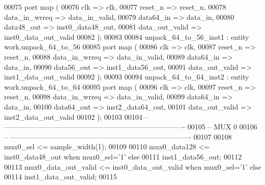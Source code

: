 \begin{DoxyCode}
00075 \textcolor{keywordflow}{port} \textcolor{keywordflow}{map} (
00076        clk              => clk,
00077       reset_n           => reset_n,
00078         data_in_wrreq   => data_in_valid,
00079         data64_in       => data_in,
00080         data48_out      => inst0_data48_out,
00081         data_out_valid  => inst0_data_out_valid
00082 \textcolor{vhdlchar}{)};
00083 
00084 unpack\_64\_to\_56\_inst1 : \textcolor{keywordflow}{entity} work.unpack_64_to_56 
00085 \textcolor{keywordflow}{port} \textcolor{keywordflow}{map} (
00086        clk              => clk,
00087       reset_n           => reset_n,
00088         data_in_wrreq   => data_in_valid,
00089         data64_in       => data_in,
00090         data56_out      => inst1_data56_out,
00091         data_out_valid  => inst1_data_out_valid
00092 \textcolor{vhdlchar}{)};
00093 
00094 unpack\_64\_to\_64\_inst2 : \textcolor{keywordflow}{entity} work.unpack_64_to_64 
00095 \textcolor{keywordflow}{port} \textcolor{keywordflow}{map} (
00096        clk              => clk,
00097       reset_n           => reset_n,
00098         data_in_wrreq   => data_in_valid,
00099         data64_in       => data_in,
00100         data64_out      => inst2_data64_out,
00101         data_out_valid  => inst2_data_out_valid
00102 \textcolor{vhdlchar}{)};
00103 
00104 \textcolor{keyword}{-- ----------------------------------------------------------------------------}
00105 \textcolor{keyword}{-- MUX 0 }
00106 \textcolor{keyword}{-- ----------------------------------------------------------------------------}
00107 
00108 \textcolor{vhdlchar}{mux0_sel}                \textcolor{vhdlchar}{<=} \textcolor{vhdlchar}{sample_width}\textcolor{vhdlchar}{(}\textcolor{vhdllogic}{}\textcolor{vhdllogic}{1}\textcolor{vhdlchar}{)};
00109 
00110 \textcolor{vhdlchar}{mux0_data128}            \textcolor{vhdlchar}{<=} \textcolor{vhdlchar}{inst0_data48_out} \textcolor{keywordflow}{when} \textcolor{vhdlchar}{mux0_sel}\textcolor{vhdlchar}{=}\textcolor{vhdlchar}{'}\textcolor{vhdllogic}{}\textcolor{vhdllogic}{1}\textcolor{vhdlchar}{'} \textcolor{keywordflow}{else} 
00111                                 inst1\_data56\_out;
00112                     
00113 \textcolor{vhdlchar}{mux0_data_out_valid}     \textcolor{vhdlchar}{<=} \textcolor{vhdlchar}{inst0_data_out_valid} \textcolor{keywordflow}{when} \textcolor{vhdlchar}{mux0_sel}\textcolor{vhdlchar}{=}\textcolor{vhdlchar}{'}\textcolor{vhdllogic}{}\textcolor{vhdllogic}{1}\textcolor{vhdlchar}{'} \textcolor{keywordflow}{else} 
00114                                 inst1\_data\_out\_valid;
00115             

\end{DoxyCode}
